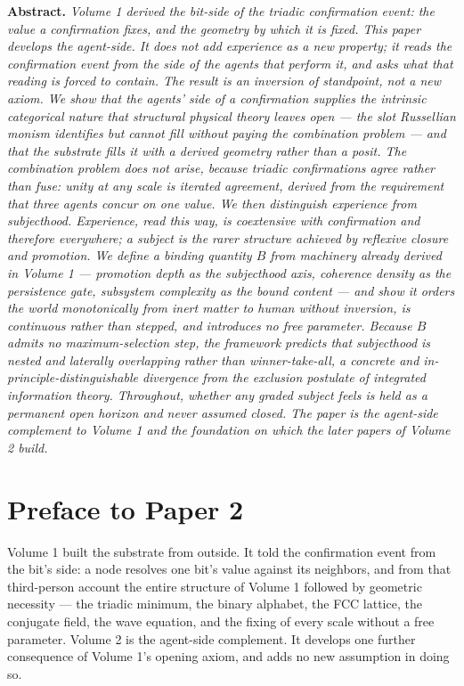 \documentclass[11pt,oneside]{report}
\theoremstyle{definition}
\theoremstyle{remark}
\newenvironment{paperabstract}
  {\begin{center}\begin{minipage}{0.88\textwidth}\small
   \noindent\textbf{Abstract.}\itshape\space}
  {\end{minipage}\end{center}\vspace{0.4em}}
\begin{document}
\begin{paperabstract}
Volume 1 derived the bit-side of the triadic confirmation event: the
value a confirmation fixes, and the geometry by which it is fixed. This
paper develops the agent-side. It does not add experience as a new
property; it reads the confirmation event from the side of the agents
that perform it, and asks what that reading is forced to contain. The
result is an inversion of standpoint, not a new axiom. We show that the
agents' side of a confirmation supplies the intrinsic categorical nature
that structural physical theory leaves open --- the slot Russellian
monism identifies but cannot fill without paying the combination problem
--- and that the substrate fills it with a derived geometry rather than a
posit. The combination problem does not arise, because triadic
confirmations agree rather than fuse: unity at any scale is iterated
agreement, derived from the requirement that three agents concur on one
value. We then distinguish experience from subjecthood. Experience, read
this way, is coextensive with confirmation and therefore everywhere; a
subject is the rarer structure achieved by reflexive closure and
promotion. We define a binding quantity \ensuremath{B} from machinery
already derived in Volume 1 --- promotion depth as the subjecthood axis,
coherence density as the persistence gate, subsystem complexity as the
bound content --- and show it orders the world monotonically from inert
matter to human without inversion, is continuous rather than stepped, and
introduces no free parameter. Because \ensuremath{B} admits no
maximum-selection step, the framework predicts that subjecthood is nested
and laterally overlapping rather than winner-take-all, a concrete and
in-principle-distinguishable divergence from the exclusion postulate of
integrated information theory. Throughout, whether any graded subject
feels is held as a permanent open horizon and never assumed closed. The
paper is the agent-side complement to Volume 1 and the foundation on
which the later papers of Volume 2 build.
\end{paperabstract}

\section*{Preface to Paper 2}

Volume 1 built the substrate from outside. It told the confirmation
event from the bit's side: a node resolves one bit's value against its
neighbors, and from that third-person account the entire structure of
Volume 1 followed by geometric necessity --- the triadic minimum, the
binary alphabet, the FCC lattice, the conjugate field, the wave
equation, and the fixing of every scale without a free parameter. Volume
2 is the agent-side complement. It develops one further consequence of
Volume 1's opening axiom, and adds no new assumption in doing so.
\end{document}
